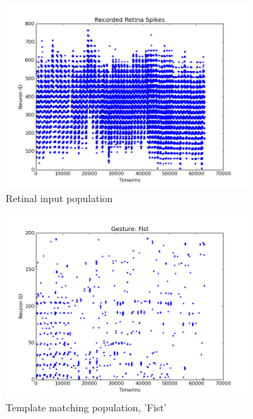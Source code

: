 \documentclass[journal]{journal}
\begin{document}
\begin{figure}
\centering
	\begin{subfigure}[t]{0.24\textwidth}
		\includegraphics[width=\textwidth]{pics/figure_32_r.png}
	    \caption{Retinal input population }
	    \label{fig:ssa32}
	\end{subfigure}
	\begin{subfigure}[t]{0.24\textwidth}
		\includegraphics[width=\textwidth]{pics/figure_32_1.png}
		\caption{Template matching population, 'Fist'}
	    \label{fig:rec032}
	\end{subfigure}
	\\
	\begin{subfigure}[t]{0.24\textwidth}

\end{subfigure}
\end{figure}
\end{document}
